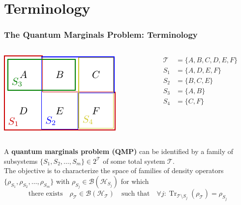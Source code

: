 \documentclass[
    9pt,
    hyperref={bookmarks=false, colorlinks=false}, %
    xcolor={dvipsnames},
]{beamer}
\DeclareMathOperator{\Tr}{Tr}
\begin{document}
\section{Terminology}
\begin{frame}
    \frametitle{The Quantum Marginals Problem: Terminology}
    \begin{columns}
        \begin{column}{0.6\textwidth}
            \begin{center}
                \includegraphics{figures/qmp_example.pdf}
            \end{center}
        \end{column}
        \begin{column}{0.4\textwidth}
            \begin{align*}
                \mathcal T &= \{ A, B, C, D, E, F \} \\
                S_1 &= \{ A, D, E, F \} \\
                S_2 &= \{ B, C, E \} \\
                S_3 &= \{ A, B \} \\
                S_4 &= \{ C, F \}
            \end{align*}
        \end{column}
    \end{columns}
    \begin{definition}
        A \textbf{quantum marginals problem (QMP)} can be identified by a family of subsystems $\{S_1,S_2, \ldots, S_m\} \in 2^{\mathcal T}$ of some total system $\mathcal T$. \\ 
        The objective is to characterize the space of families of density operators $\{\rho_{S_1}, \rho_{S_2}, \ldots, \rho_{S_m}\}$ with $\rho_{S_j} \in \mathcal B (\mathcal H_{S_j})$ for which
        \[ \text{there exists} \quad \rho_{\mathcal T} \in \mathcal B(\mathcal H_{\mathcal{T}}) \quad \text{such that} \quad \forall j : \Tr_{\mathcal T \setminus S_j}(\rho_{\mathcal T}) = \rho_{S_j} \] 
    \end{definition}
\end{frame}
\end{document}
